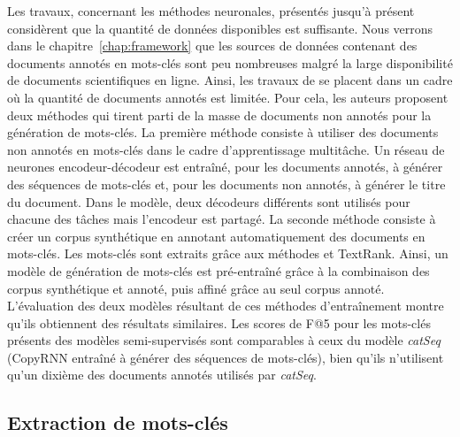 Les travaux, concernant les méthodes neuronales, présentés jusqu'à présent considèrent que la quantité de données disponibles est suffisante.
Nous verrons dans le chapitre~\ref{chap:framework} que les sources de données contenant des documents annotés en mots-clés sont peu nombreuses malgré la large disponibilité de documents scientifiques en ligne.
Ainsi, les travaux de \citet{ye_semi-supervised_2018} se placent dans un cadre où la quantité de documents annotés est limitée.
%
Pour cela, les auteurs proposent deux méthodes qui tirent parti de la masse de documents non annotés pour la génération de mots-clés.
%
La première méthode consiste à utiliser des documents non annotés en mots-clés dans le cadre d'apprentissage multitâche.
Un réseau de neurones encodeur-décodeur est entraîné, pour les documents annotés, à générer des séquences de mots-clés et, pour les documents non annotés, à générer le titre du document. Dans le modèle, deux décodeurs différents sont utilisés pour chacune des tâches mais l'encodeur est partagé.
%
La seconde méthode consiste à créer un corpus synthétique en annotant automatiquement des documents en mots-clés. Les mots-clés sont extraits grâce aux méthodes \tfidf{} et TextRank.
Ainsi, un modèle de génération de mots-clés est pré-entraîné grâce à la combinaison des corpus synthétique et annoté, puis affiné grâce au seul corpus annoté.
%
L'évaluation des deux modèles résultant de ces méthodes d'entraînement montre qu'ils obtiennent des résultats similaires.
Les scores de F@5 pour les mots-clés présents des modèles semi-supervisés sont comparables à ceux du modèle \emph{catSeq} (CopyRNN entraîné à générer des séquences de mots-clés), bien qu'ils n'utilisent qu'un dixième des documents annotés utilisés par \emph{catSeq}.

\subsection{Extraction de mots-clés}

